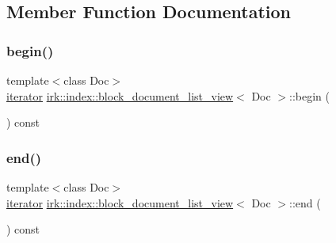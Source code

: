 \subsection{Member Function Documentation}
\mbox{\label{classirk_1_1index_1_1block__document__list__view_a6c320fd31232ebba37be70c0c9f682c4}} 
\subsubsection{\texorpdfstring{begin()}{begin()}}
{\footnotesize\ttfamily template$<$class Doc$>$ \\
\mbox{\hyperlink{classirk_1_1index_1_1block__document__list__view_ac9190c4c0eb1b9cc20a1b6a5fbea1d80}{iterator}} \mbox{\hyperlink{classirk_1_1index_1_1block__document__list__view}{irk\+::index\+::block\+\_\+document\+\_\+list\+\_\+view}}$<$ Doc $>$\+::begin (\begin{DoxyParamCaption}{ }\end{DoxyParamCaption}) const\hspace{0.3cm}{\ttfamily [inline]}}

\mbox{\label{classirk_1_1index_1_1block__document__list__view_a1edd00780b264af57cadf53fadf2ced3}} 
\subsubsection{\texorpdfstring{end()}{end()}}
{\footnotesize\ttfamily template$<$class Doc$>$ \\
\mbox{\hyperlink{classirk_1_1index_1_1block__document__list__view_ac9190c4c0eb1b9cc20a1b6a5fbea1d80}{iterator}} \mbox{\hyperlink{classirk_1_1index_1_1block__document__list__view}{irk\+::index\+::block\+\_\+document\+\_\+list\+\_\+view}}$<$ Doc $>$\+::end (\begin{DoxyParamCaption}{ }\end{DoxyParamCaption}) const\hspace{0.3cm}{\ttfamily [inline]}}

